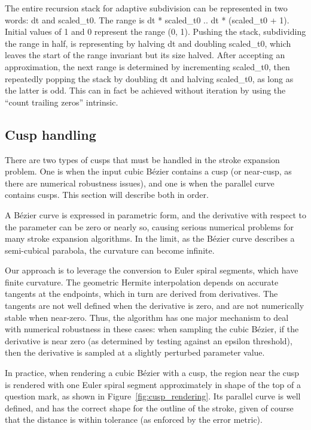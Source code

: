 \documentclass[sigconf, authordraft]{acmart}
\begin{document}
The entire recursion stack for adaptive subdivision can be represented in two words: dt and scaled\_t0. The range is dt * scaled\_t0 .. dt * (scaled\_t0 + 1). Initial values of 1 and 0 represent the range (0, 1). Pushing the stack, subdividing the range in half, is representing by halving dt and doubling scaled\_t0, which leaves the start of the range invariant but its size halved. After accepting an approximation, the next range is determined by incrementing scaled\_t0, then repeatedly popping the stack by doubling dt and halving scaled\_t0, as long as the latter is odd. This can in fact be achieved without iteration by using the ``count trailing zeros'' intrinsic.

\subsection{Cusp handling}

There are two types of cusps that must be handled in the stroke expansion problem. One is when the input cubic Bézier contains a cusp (or near-cusp, as there are numerical robustness issues), and one is when the parallel curve contains cusps. This section will describe both in order.

A Bézier curve is expressed in parametric form, and the derivative with respect to the parameter can be zero or nearly so, causing serious numerical problems for many stroke expansion algorithms. In the limit, as the Bézier curve describes a semi-cubical parabola, the curvature can become infinite.

Our approach is to leverage the conversion to Euler spiral segments, which have finite curvature. The geometric Hermite interpolation depends on accurate tangents at the endpoints, which in turn are derived from derivatives. The tangents are not well defined when the derivative is zero, and are not numerically stable when near-zero. Thus, the algorithm has one major mechanism to deal with numerical robustness in these cases: when sampling the cubic Bézier, if the derivative is near zero (as determined by testing against an epsilon threshold), then the derivative is sampled at a slightly perturbed parameter value.

In practice, when rendering a cubic Bézier with a cusp, the region near the cusp is rendered with one Euler spiral segment approximately in shape of the top of a question mark, as shown in Figure~\ref{fig:cusp_rendering}. Its parallel curve is well defined, and has the correct shape for the outline of the stroke, given of course that the distance is within tolerance (as enforced by the error metric).
\end{document}
